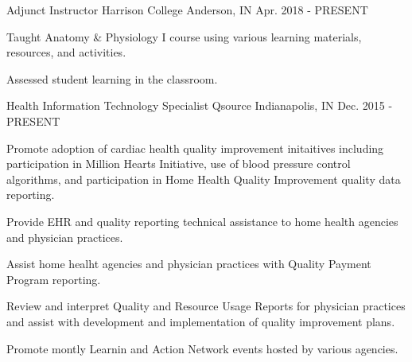 

\begin{cventries}

  \cventry
    {Adjunct Instructor}
    {Harrison College}
    {Anderson, IN}
    {Apr. 2018 - PRESENT}
    {
      \begin{cvitems}
        \item {Taught Anatomy \& Physiology I course using various learning materials, resources, and activities.}
        \item {Assessed student learning in the classroom.}
      \end{cvitems}
    }

  \cventry
    {Health Information Technology Specialist} %
    {Qsource} %
    {Indianapolis, IN} %
    {Dec. 2015 - PRESENT} %
    {
      \begin{cvitems} %
        \item {Promote adoption of cardiac health quality improvement initaitives including participation in Million Hearts Initiative, use of blood pressure control algorithms, and participation in Home Health Quality Improvement quality data reporting.}
        \item {Provide EHR and quality reporting technical assistance to home health agencies and physician practices.}
        \item {Assist home healht agencies and physician practices with Quality Payment Program reporting.}
        \item {Review and interpret Quality and Resource Usage Reports for physician practices and assist with development and implementation of quality improvement plans.}
        \item {Promote montly Learnin and Action Network events hosted by various agencies.}
      \end{cvitems}
    }


\end{cventries}
